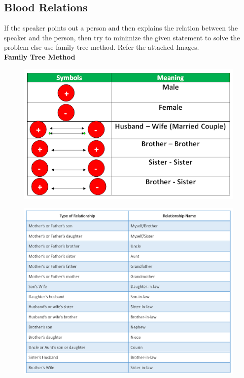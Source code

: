 \subsection{Blood Relations}
If the speaker points out a person and then explains the relation between the speaker and the person, then try to minimize the given statement to solve the problem else use family tree method. Refer the attached Images.\vspace{0.2cm}\\
\textbf{Family Tree Method}
\begin{figure}[h!]
    \centering
    \includegraphics[scale=0.525]{images/blood-relation-family-tree-2.png}
\end{figure}
\begin{figure}[h!]
    \centering
    \includegraphics[width=\linewidth]{images/blood-relation.png}
\end{figure}


